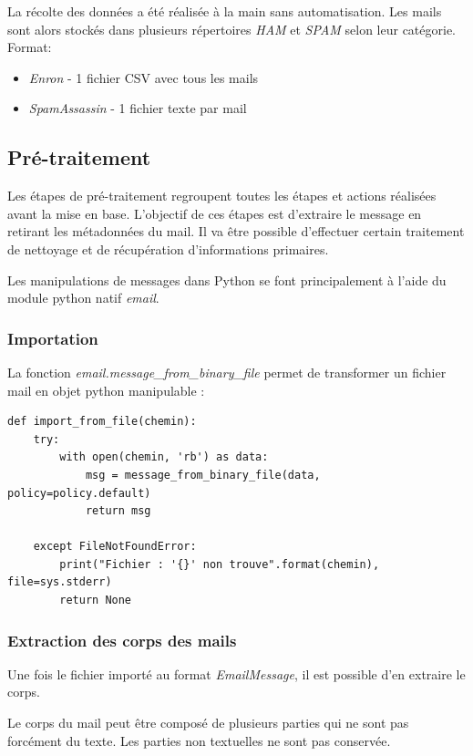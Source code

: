 \documentclass[a4paper,12pt]{article}
\begin{document}
			La récolte des données a été réalisée à la main sans automatisation. 
			Les mails sont alors stockés dans plusieurs répertoires \emph{HAM} et \emph{SPAM} selon leur catégorie. \\
			
			Format:
			\begin{itemize}
				\item \emph{Enron} - 1 fichier CSV avec tous les mails
				\item \emph{SpamAssassin} - 1 fichier texte par mail
			\end{itemize}
	
	\subsection{Pré-traitement}
		Les étapes de pré-traitement regroupent toutes les étapes et actions réalisées avant la mise en base. 
		L'objectif de ces étapes est d'extraire le message en retirant les métadonnées du mail.
		Il va être possible d'effectuer certain traitement de nettoyage et de récupération d'informations primaires.
		
		Les manipulations de messages dans Python se font principalement à l'aide du module python natif \emph{email}. 
		
		\subsubsection{Importation}		
			La fonction \emph{email.message\_from\_binary\_file} permet de transformer un fichier mail en objet python manipulable :
			\begin{lstlisting}[title=Fonction d'importation des fichiers]
def import_from_file(chemin):
    try:
        with open(chemin, 'rb') as data:
            msg = message_from_binary_file(data, policy=policy.default)
            return msg
	
    except FileNotFoundError:
        print("Fichier : '{}' non trouve".format(chemin), file=sys.stderr)
        return None\end{lstlisting}
		
		
		\subsubsection{Extraction des corps des mails}
			Une fois le fichier importé au format \emph{EmailMessage}, il est possible d'en extraire le corps.
			
			Le corps du mail peut être composé de plusieurs parties qui ne sont pas forcément du texte. Les parties non textuelles ne sont pas conservée. 
					
\end{document}
